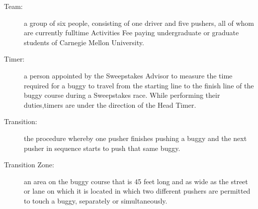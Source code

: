 \begin{description}
	\item[Team:]
	a group of six people, consisting of one driver and five pushers, all of
	whom are currently fulltime Activities Fee paying undergraduate or graduate
	students of Carnegie Mellon University.

	\item[Timer:]
	a person appointed by the Sweepstakes Advisor to measure the time required
	for a buggy to travel from the starting line to the finish line of the buggy
	course during a Sweepstakes race. While performing their duties,timers are
	under the direction of the Head Timer.

	\item[Transition:]
	the procedure whereby one pusher finishes pushing a buggy and the next
	pusher in sequence starts to push that same buggy.

	\item[Transition Zone:]
	an area on the buggy course that is 45 feet long and as wide as the street
	or lane on which it is located in which two different pushers are permitted to
	touch a buggy, separately or simultaneously.

\end{description}

